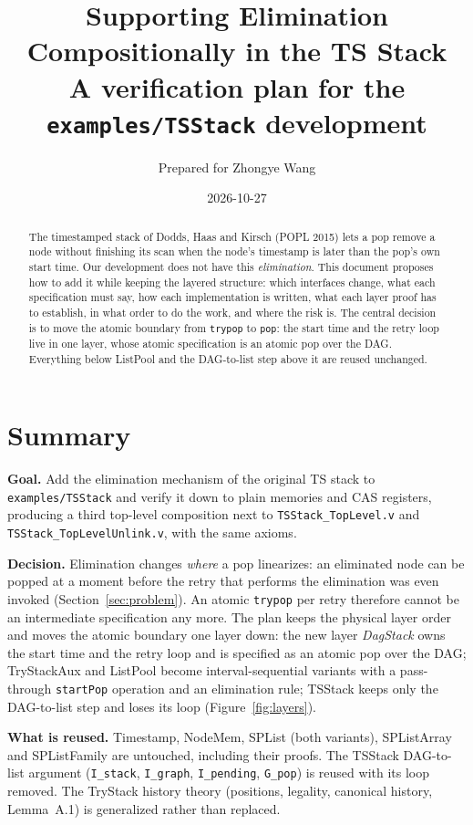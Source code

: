 \documentclass[11pt]{article}
\title{Supporting Elimination Compositionally in the TS Stack\\
  \large A verification plan for the \texttt{examples/TSStack} development}
\author{Prepared for Zhongye Wang}
\date{2026-10-27}
\theoremstyle{definition}
\theoremstyle{remark}
\newcommand{\code}[1]{\texttt{#1}}
\newcommand{\file}[1]{\texttt{#1}}
\newcommand{\sol}[1]{\textbf{#1}}
\begin{document}
\maketitle

\begin{abstract}
The timestamped stack of Dodds, Haas and Kirsch (POPL 2015) lets a pop
remove a node without finishing its scan when the node's timestamp is
later than the pop's own start time. Our development does not have this
\emph{elimination}. This document proposes how to add it while keeping
the layered structure: which interfaces change, what each specification
must say, how each implementation is written, what each layer proof has
to establish, in what order to do the work, and where the risk is. The
central decision is to move the atomic boundary from \code{trypop} to
\code{pop}: the start time and the retry loop live in one layer, whose
atomic specification is an atomic pop over the DAG. Everything below
ListPool and the DAG-to-list step above it are reused unchanged.
\end{abstract}

\tableofcontents

\section{Summary}

\sol{Goal.} Add the elimination mechanism of the original TS stack to
\file{examples/TSStack} and verify it down to plain memories and CAS
registers, producing a third top-level composition next to
\file{TSStack\_TopLevel.v} and \file{TSStack\_TopLevelUnlink.v}, with the
same axioms.

\sol{Decision.} Elimination changes \emph{where} a pop linearizes: an
eliminated node can be popped at a moment before the retry that performs
the elimination was even invoked (Section~\ref{sec:problem}). An atomic
\code{trypop} per retry therefore cannot be an intermediate specification
any more. The plan keeps the physical layer order and moves the atomic
boundary one layer down: the new layer \emph{DagStack} owns the start
time and the retry loop and is specified as an atomic pop over the DAG;
TryStackAux and ListPool become interval-sequential variants with a
pass-through \code{startPop} operation and an elimination rule; TSStack
keeps only the DAG-to-list step and loses its loop
(Figure~\ref{fig:layers}).

\sol{What is reused.} Timestamp, NodeMem, SPList (both variants),
SPListArray and SPListFamily are untouched, including their proofs. The
TSStack DAG-to-list argument (\code{I\_stack}, \code{I\_graph},
\code{I\_pending}, \code{G\_pop}) is reused with its loop removed. The
TryStack history theory (positions, legality, canonical history,
Lemma~A.1) is generalized rather than replaced.
\end{document}
